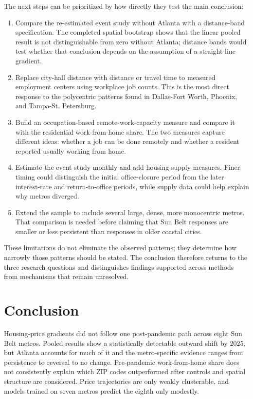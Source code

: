 \documentclass[11pt]{article}
\begin{document}
The next steps can be prioritized by how directly they test the main conclusion:
\begin{enumerate}
\item Compare the re-estimated event study without Atlanta with a distance-band specification. The completed spatial bootstrap
shows that the linear pooled result is not distinguishable from zero without Atlanta; distance bands would test whether that
conclusion depends on the assumption of a straight-line gradient.
\item Replace city-hall distance with distance or travel time to measured employment centers using workplace job counts. This is
the most direct response to the polycentric patterns found in Dallas-Fort Worth, Phoenix, and Tampa-St. Petersburg.
\item Build an occupation-based remote-work-capacity measure and compare it with the residential work-from-home share. The two
measures capture different ideas: whether a job can be done remotely and whether a resident reported usually working from home.
\item Estimate the event study monthly and add housing-supply measures. Finer timing could distinguish the initial office-closure
period from the later interest-rate and return-to-office periods, while supply data could help explain why metros diverged.
\item Extend the sample to include several large, dense, more monocentric metros. That comparison is needed before claiming that
Sun Belt responses are smaller or less persistent than responses in older coastal cities.
\end{enumerate}

These limitations do not eliminate the observed patterns; they determine how narrowly those patterns should be stated. The
conclusion therefore returns to the three research questions and distinguishes findings supported across methods from mechanisms
that remain unresolved.

\clearpage
\section{Conclusion}

Housing-price gradients did not follow one post-pandemic path across eight Sun Belt metros. Pooled results show a statistically
detectable outward shift by 2025, but Atlanta accounts for much of it and the metro-specific evidence ranges from persistence to
reversal to no change. Pre-pandemic work-from-home share does not consistently explain which ZIP codes outperformed after controls and
spatial structure are considered. Price trajectories are only weakly clusterable, and models trained on seven metros predict the
eighth only modestly.
\end{document}
